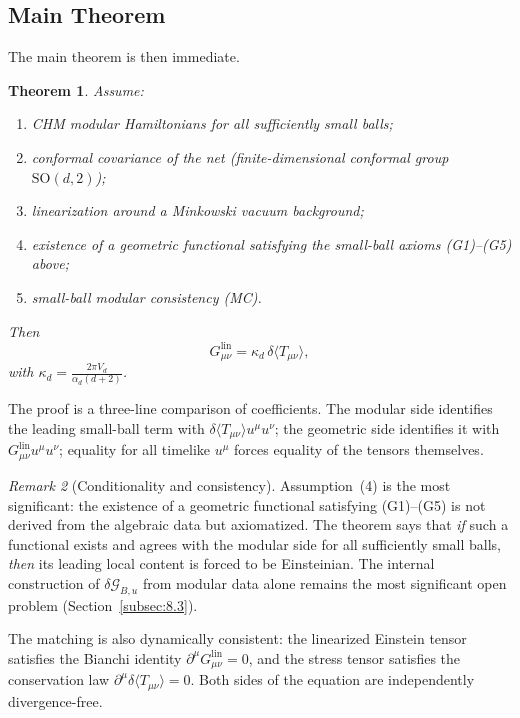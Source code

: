 \documentclass[12pt]{article}
\newtheorem{theorem}{Theorem}[section]
\theoremstyle{definition}
\theoremstyle{remark}
\newtheorem{remark}[theorem]{Remark}
\begin{document}
\subsection{Main Theorem}\label{subsec:4.3}

The main theorem is then immediate.

\begin{theorem}\label{thm:II.4}
Assume:
\begin{enumerate}
\item CHM modular Hamiltonians for all sufficiently small balls;
\item conformal covariance of the net (finite-dimensional conformal group \(\mathrm{SO}(d,2)\));
\item linearization around a Minkowski vacuum background;
\item existence of a geometric functional satisfying the small-ball axioms (G1)--(G5) above;
\item small-ball modular consistency (MC).
\end{enumerate}
Then
\[
G^{\mathrm{lin}}_{\mu\nu}
=
\kappa_d\,
\delta\langle T_{\mu\nu}\rangle,
\]
with \(\kappa_d = \frac{2\pi V_d}{\alpha_d(d+2)}\).
\end{theorem}

The proof is a three-line comparison of coefficients. The modular side identifies the leading small-ball term with \(\delta\langle T_{\mu\nu}\rangle u^\mu u^\nu\); the geometric side identifies it with \(G^{\mathrm{lin}}_{\mu\nu}u^\mu u^\nu\); equality for all timelike \(u^\mu\) forces equality of the tensors themselves.

\begin{remark}[Conditionality and consistency]
Assumption~(4) is the most significant: the existence of a geometric
functional satisfying (G1)--(G5) is not derived from the algebraic
data but axiomatized. The theorem says that \emph{if} such a functional
exists and agrees with the modular side for all sufficiently small
balls, \emph{then} its leading local content is forced to be
Einsteinian. The internal construction of
\(\delta\mathcal{G}_{B,u}\) from modular data alone remains the most
significant open problem (Section~\ref{subsec:8.3}).

The matching is also dynamically consistent: the linearized Einstein
tensor satisfies the Bianchi identity
\(\partial^\mu G^{\mathrm{lin}}_{\mu\nu}=0\), and the stress tensor
satisfies the conservation law
\(\partial^\mu\delta\langle T_{\mu\nu}\rangle=0\). Both sides of the
equation are independently divergence-free.
\end{remark}
\end{document}
